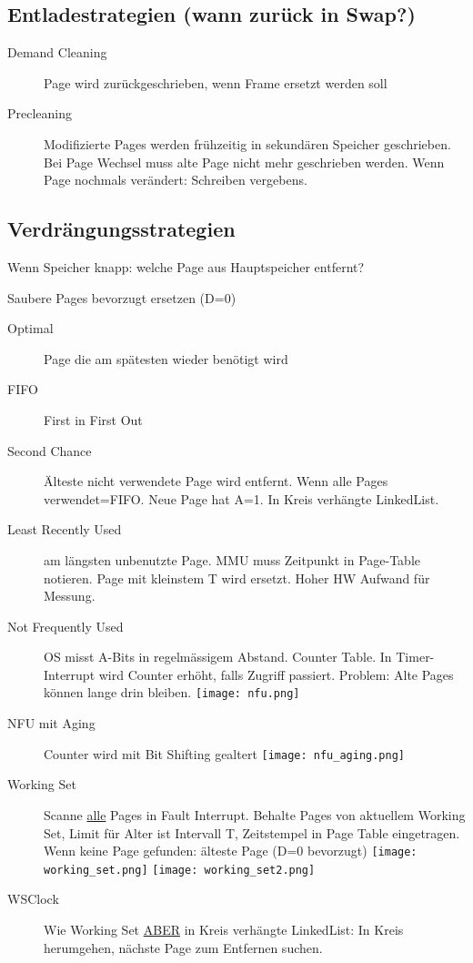 \begin{multicols*}{4}
\subsection{Entladestrategien (wann zurück in Swap?)}
\begin{description}
    \item[Demand Cleaning] Page wird zurückgeschrieben, wenn Frame ersetzt werden soll
    \item[Precleaning] Modifizierte Pages werden frühzeitig in sekundären Speicher geschrieben.
    Bei Page Wechsel muss alte Page nicht mehr geschrieben werden. Wenn Page nochmals verändert: Schreiben vergebens.
\end{description}

\subsection{Verdrängungsstrategien}
Wenn Speicher knapp: welche Page aus Hauptspeicher entfernt?

Saubere Pages bevorzugt ersetzen (D=0)

\begin{description}
    \item[Optimal] Page die am spätesten wieder benötigt wird
    \item[FIFO] First in First Out
    \item[Second Chance] Älteste nicht verwendete Page wird entfernt. Wenn alle Pages verwendet=FIFO. Neue Page hat A=1. In Kreis verhängte LinkedList.
    \item[Least Recently Used] am längsten unbenutzte Page. MMU muss Zeitpunkt in Page-Table notieren. Page mit kleinstem T wird ersetzt. Hoher HW Aufwand für Messung.
    \item[Not Frequently Used] OS misst A-Bits in regelmässigem Abstand. Counter Table. In Timer-Interrupt wird Counter erhöht, falls Zugriff passiert. Problem: Alte Pages können lange drin bleiben.  \texttt{[image: nfu.png]}
    \item[NFU mit Aging] Counter wird mit Bit Shifting gealtert \texttt{[image: nfu\_aging.png]}
    \item[Working Set] Scanne \underline{alle} Pages in Fault Interrupt. Behalte Pages von aktuellem Working Set, Limit für Alter ist Intervall T, Zeitstempel in Page Table eingetragen. Wenn keine Page gefunden: älteste Page (D=0 bevorzugt)
    \texttt{[image: working\_set.png]}
    \texttt{[image: working\_set2.png]}

    \item[WSClock] Wie Working Set \underline{ABER} in Kreis verhängte LinkedList: In Kreis herumgehen, nächste Page zum Entfernen suchen.
\end{description}


\end{multicols*}
